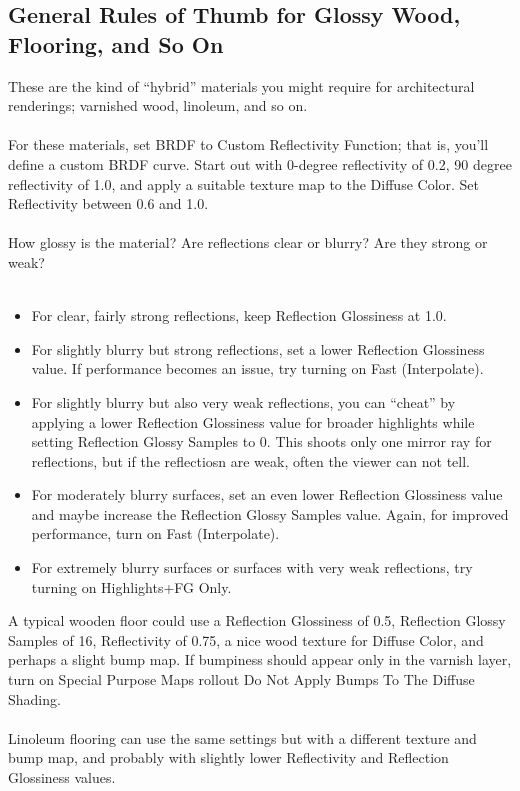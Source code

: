 \documentclass[10pt,a4paper]{article}
\begin{document}
\subsection{General Rules of Thumb for Glossy Wood, Flooring, and So On}
These are the kind of “hybrid” materials you might require for architectural renderings; varnished wood, linoleum, and so on.
\\
\\
For these materials, set BRDF to Custom Reflectivity Function; that is, you'll define a custom BRDF curve. Start out with 0-degree reflectivity of 0.2, 90 degree reflectivity of 1.0, and apply a suitable texture map to the Diffuse Color. Set Reflectivity between 0.6 and 1.0.
\\
\\
How glossy is the material? Are reflections clear or blurry? Are they strong or weak?
\\
\\
\begin{itemize}
	\item For clear, fairly strong reflections, keep Reflection Glossiness at 1.0.
	\item For slightly blurry but strong reflections, set a lower Reflection Glossiness value. If performance becomes an issue, try turning on Fast (Interpolate).
	\item For slightly blurry but also very weak reflections, you can “cheat” by applying a lower Reflection Glossiness value for broader highlights while setting Reflection Glossy Samples to 0. This shoots only one mirror ray for reflections, but if the reflectiosn are weak, often the viewer can not tell.
	\item For moderately blurry surfaces, set an even lower Reflection Glossiness value and maybe increase the Reflection Glossy Samples value. Again, for improved performance, turn on Fast (Interpolate).
	\item For extremely blurry surfaces or surfaces with very weak reflections, try turning on Highlights+FG Only.
\end{itemize}

A typical wooden floor could use a Reflection Glossiness of 0.5, Reflection Glossy Samples of 16, Reflectivity of 0.75, 
a nice wood texture for Diffuse Color, and perhaps a slight bump map. 
If bumpiness should appear only in the varnish layer, turn on Special Purpose Maps rollout  Do Not Apply Bumps To The Diffuse Shading.
\\
\\
Linoleum flooring can use the same settings but with a different texture and bump map, and probably with slightly lower Reflectivity and Reflection Glossiness values.
\\
\\
\end{document}
